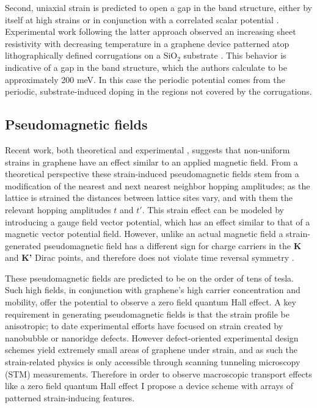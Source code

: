 \documentclass[edeposit,fullpage,draftthesis]{uiucthesis2009}
\begin{document}
        Second, uniaxial strain is predicted to open a gap in the band structure, either by itself at high strains \cite{Pereira2009} or in conjunction with a correlated scalar potential \cite{Low2011}. Experimental work following the latter approach observed an increasing sheet resistivity with decreasing temperature in a graphene device patterned atop lithographically defined corrugations on a SiO$_2$ substrate \cite{Lee2013}. This behavior is indicative of a gap in the band structure, which the authors calculate to be approximately 200 meV. In this case the periodic potential comes from the periodic, substrate-induced doping in the regions not covered by the corrugations.
    
        \subsection{Pseudomagnetic fields}
        Recent work, both theoretical \cite{Guinea2009} and experimental \cite{Levy2010}, \cite{Yan2012} suggests that non-uniform strains in graphene have an effect similar to an applied magnetic field. From a theoretical perspective these strain-induced pseudomagnetic fields stem from a modification of the nearest and next nearest neighbor hopping amplitudes; as the lattice is strained the distances between lattice sites vary, and with them the relevant hopping amplitudes $t$ and $t'$. This strain effect can be modeled by introducing a gauge field vector potential, which has an effect similar to that of a magnetic vector potential field. However, unlike an actual magnetic field a strain-generated pseudomagnetic field has a different sign for charge carriers in the \textbf{K} and \textbf{K'} Dirac points, and therefore does not violate time reversal symmetry \cite{Guinea2009}.
    
        These pseudomagnetic fields are predicted to be on the order of tens of tesla. Such high fields, in conjunction with graphene's high carrier concentration and mobility, offer the potential to observe a zero field quantum Hall effect. A key requirement in generating pseudomagnetic fields is that the strain profile be anisotropic; to date experimental efforts have focused on strain created by nanobubble \cite{Levy2010} or nanoridge \cite{Yan2012} defects. However defect-oriented experimental design schemes yield extremely small areas of graphene under strain, and as such the strain-related physics is only accessible through scanning tunneling microscopy (STM) measurements. Therefore in order to observe macroscopic transport effects like a zero field quantum Hall effect I propose a device scheme with arrays of patterned strain-inducing features.
\end{document}
